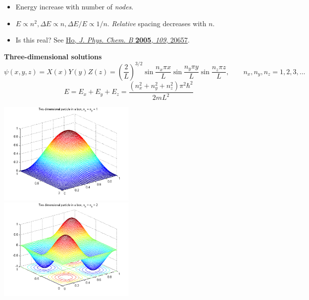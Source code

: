 \documentclass[11pt]{article}
\begin{document}
\begin{itemize}
\item Energy increase with number of \emph{nodes}.

\item $E\propto n^2, \Delta E \propto n, \Delta E/E \propto 1/n$.  \emph{Relative} spacing decreases with $n$.

\item Is this real?  See \href{http://dx.doi.org/10.1021/jp053496l}{Ho, \emph{J. Phys. Chem. B} \textbf{2005}, \emph{109}, 20657}.
\end{itemize}

\textbf{Three-dimensional solutions}
\begin{equation}
\psi(x,y,z) = X(x)Y(y)Z(z) = \left ( \frac{2}{L} \right )^{3/2} \sin\frac{n_x\pi x}{L}\sin\frac{n_y\pi y}{L}\sin\frac{n_z\pi z}{L},\qquad n_{x},n_{y},n_{z}=1,2,3,\ldots
\end{equation}
\begin{equation}
\label{eq:2}
E = E_{x}+E_{y}+E_{z}=\frac{(n_{x}^{2}+n_{y}^{2}+n_{z}^{2}) \pi^{2}\hbar^{2}}{2 m L^{2}}
\end{equation}

\includegraphics[width=0.5\textwidth]{./Images/2DSine1.png}
\includegraphics[width=0.5\textwidth]{./Images/2DSine2.png}
\end{document}
